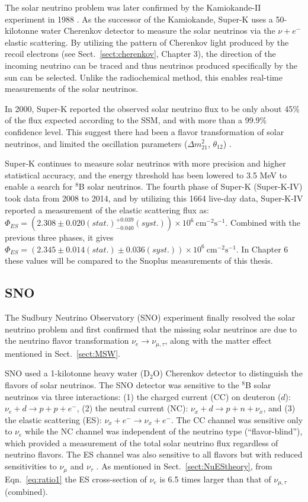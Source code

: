The solar neutrino problem was later confirmed by the Kamiokande-II experiment in 1988 \cite{superKwebsite}. As the successor of the Kamiokande, Super-K uses a 50-kilotonne water Cherenkov detector to measure the solar neutrinos via the $\nu+e^-$ elastic scattering. By utilizing the pattern of Cherenkov light produced by the recoil electrons (see Sect.~\ref{sect:cherenkov}, Chapter 3), the direction of the incoming neutrino can be traced and thus  neutrinos produced specifically by the sun can be selected. Unlike the radiochemical method, this enables real-time measurements of the solar neutrinos.

In 2000, Super-K reported the observed solar neutrino flux to be only about 45\% of the flux expected according to the SSM, and with more than a 99.9\% confidence level. This suggest there had been a flavor transformation of solar neutrinos, and limited the oscillation parameters ($\Delta m^2_{21}$, $\theta_{12}$) \cite{superKwebsite}. 

Super-K continues to measure solar neutrinos with more precision and higher statistical accuracy, and the energy threshold has been lowered to 3.5 MeV to enable a search for $^8$B solar neutrinos. The fourth phase of Super-K (Super-K-IV) took data from 2008 to 2014, and by utilizing this 1664 live-day data, Super-K-IV reported a measurement of the elastic scattering flux as: $\Phi_{ES}=(2.308\pm0.020(stat.)^{+0.039}_{-0.040}(syst.))\times 10^6~\mathrm{cm^{-2}s^{-1}}$\cite{abe2016solar}. Combined with the previous three phases, it gives $\Phi_{ES}=(2.345\pm0.014(stat.)\pm 0.036(syst.))\times 10^6~\mathrm{cm^{-2}s^{-1}}$\cite{abe2016solar}. In Chapter 6 these values will be compared to the Snoplus measurements of this thesis.

\subsection{SNO}

The Sudbury Neutrino Observatory (SNO) experiment finally resolved the solar neutrino problem and first confirmed that the missing solar neutrinos are due to the neutrino flavor transformation $\nu_e\to\nu_{\mu,\tau}$, along with the matter effect mentioned in Sect.~\ref{sect:MSW}. 

SNO used a 1-kilotonne heavy water (D$_2$O) Cherenkov detector to distinguish the flavors of solar neutrinos. The SNO detector was sensitive to the $^8$B solar neutrinos via three interactions: (1) the charged current (CC) on deuteron ($d$): $\nu_e+d\to p+p+e^-$, (2) the neutral current (NC): $\nu_x+d\to p+n+\nu_x$, and (3) the elastic scattering (ES): $\nu_x+e^-\to \nu_x+e^-$. The CC channel was sensitive only to $\nu_e$ while the NC channel was independent of the neutrino type (``flavor-blind''), which provided a measurement of the total solar neutrino flux regardless of neutrino flavors. The ES channel was also sensitive to all flavors but with reduced sensitivities to $\nu_\mu$ and $\nu_\tau$ \cite{ahmad2002direct}. As mentioned in Sect.~\ref{sect:NuEStheory}, from Eqn.~\ref{eq:ratio1} the ES cross-section of $\nu_e$ is 6.5 times larger than that of $\nu_{\mu,\tau}$ (combined). 

